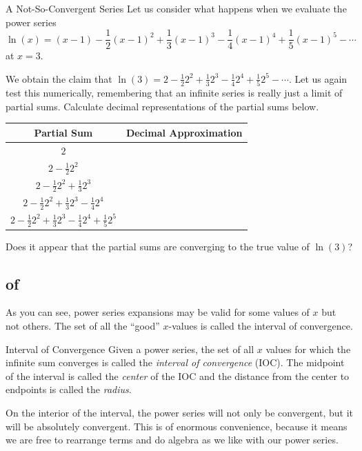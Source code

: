 \begin{exercise}{A Not-So-Convergent Series \Coffeecup}
Let us consider what happens when we evaluate the power series $$\ln(x)=(x-1)-\frac{1}{2}(x-1)^2+\frac{1}{3}(x-1)^3-\frac{1}{4}(x-1)^4+\frac{1}{5}(x-1)^5-\cdots  $$ at $x=3$.

We obtain the claim that $\ln(3)=2-\frac{1}{2}2^2+\frac{1}{3}2^3-\frac{1}{4}2^4+\frac{1}{5}2^5-\cdots $.  Let us again test this numerically, remembering that an infinite series is really just a limit of partial sums.  Calculate decimal representations of the partial sums below.
\begin{center}
\begin{tabular}{|c|c|}\hline
Partial Sum & Decimal Approximation \\ \hline
$2$ & \\
$2-\frac{1}{2}2^2$ & \\
$2-\frac{1}{2}2^2+\frac{1}{3}2^3$ & \\
$2-\frac{1}{2}2^2+\frac{1}{3}2^3-\frac{1}{4}2^4$ & \\
$2-\frac{1}{2}2^2+\frac{1}{3}2^3-\frac{1}{4}2^4+\frac{1}{5}2^5$ & \\ \hline
\end{tabular}
\end{center}
Does it appear that the partial sums are converging to the true value of $\ln(3)$? \vspace*{1in}

\end{exercise}

\subsection{ of }

As you can see, power series expansions may be valid for some values of $x$ but not others.  The set of all the ``good'' $x$-values is called the interval of convergence.

\begin{definition}{Interval of Convergence}
Given a power series, the set of all $x$ values for which the infinite sum converges is called the \emph{interval of convergence} (IOC).  The midpoint of the interval is called the \emph{center} of the IOC and the distance from the center to endpoints is called the \emph{radius}. 
\end{definition}

On the interior of the interval, the power series will not only be convergent, but it will be absolutely convergent. This is of enormous convenience, because it means we are free to rearrange terms and do algebra as we like with our power series.

